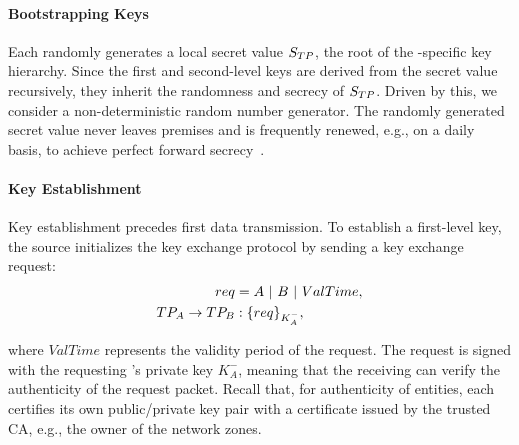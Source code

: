 \paragraph{Bootstrapping Keys}
Each \tp randomly generates a local secret value $S_{TP}$, the root of the \tp-specific
key hierarchy. Since the first and second-level keys are derived from the secret value
recursively, they inherit the randomness and secrecy of $S_{TP}$. Driven by this, we
consider a non-deterministic random number generator. The randomly generated secret value
never leaves \tp premises and is frequently renewed, e.g., on a daily basis, to achieve
perfect forward secrecy~\cite{rfc1363}.




\paragraph{Key Establishment}
Key establishment precedes first data transmission. To establish a first-level key,
the source \tp initializes the key exchange protocol by sending a key exchange request:
\noindent
\begin{subequations}
	\begin{align}
		req                     & = A~|~B~|~ValTime, \\
		TP_A \rightarrow TP_B & : \{req\}_{K^-_A}, 
	\end{align}
	\label{eq:req}
\end{subequations}

\noindent 
where $ValTime$ represents the validity period of the request. The request is signed with
the requesting \tp's private key ${K^-_A}$, meaning that the receiving \tp can verify the
authenticity of the request packet. Recall that, for authenticity of \name entities, each
\tp certifies its own public/private key pair with a certificate issued by the trusted CA,
e.g., the owner of the network zones.

